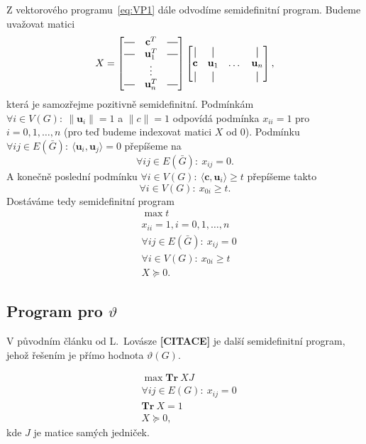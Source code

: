 Z vektorového programu~\ref{eq:VP1} dále odvodíme semidefinitní program. Budeme uvažovat matici
$$
    X =
    \begin{bmatrix}
        \horzbar & \mathbf{c}^T   & \horzbar \\
        \horzbar & \mathbf{u}_1^T & \horzbar \\
                 & \vdots         & \\
        \horzbar & \mathbf{u}_n^T & \horzbar
    \end{bmatrix}
    \begin{bmatrix}
        \vertbar   & \vertbar     &       & \vertbar \\
        \mathbf{c} & \mathbf{u}_1 & \dots & \mathbf{u}_n \\
        \vertbar   & \vertbar     &       & \vertbar \\
    \end{bmatrix},
$$
která je samozřejme pozitivně semidefinitní.
Podmínkám $\forall i \in V(G):\ \| \mathbf{u}_i \| = 1$ a $\|c\|=1$ odpovídá podmínka $x_{ii} = 1$ pro $i = 0, 1, \dots, n$ (pro teď budeme indexovat matici $X$ od $0$). Podmínku $\forall ij \in E(\bar{G}):\ \langle \mathbf{u}_i, \mathbf{u}_j \rangle = 0$ přepíšeme na
$$
    \forall ij \in E(\bar{G}):\ x_{ij} = 0.
$$
A konečně poslední podmínku $\forall i \in V(G):\ \langle \mathbf{c}, \mathbf{u}_i \rangle \geq t$ přepíšeme takto
$$
    \forall i \in V(G):\ x_{0i} \geq t.
$$
Dostáváme tedy semidefinitní program
\begin{equation}\tag{SDP1}
    \begin{split}
        &\max t \\
        &x_{ii} = 1, i = 0, 1, \dots, n \\
        &\forall ij \in E(\bar{G}):\ x_{ij} = 0 \\
        &\forall i \in V(G):\ x_{0i}  \geq t \\
        &X \succeq 0.
    \end{split}
    \label{eq:SDP1}
\end{equation}


\subsection*{Program pro $\vartheta$}

V původním článku od L.~Lovásze \textbf{[CITACE]} je další semidefinitní program, jehož řešením je přímo hodnota $\vartheta(G)$.

\begin{equation}\tag{SDP2}
    \begin{split}
        &\max \textbf{Tr}\ XJ \\
        &\forall ij \in E(G):\ x_{ij} = 0 \\
        &\textbf{Tr}\ X = 1 \\
        &X \succeq 0,
    \end{split}
    \label{eq:SDP2}
\end{equation}
kde $J$ je matice samých jedniček.


